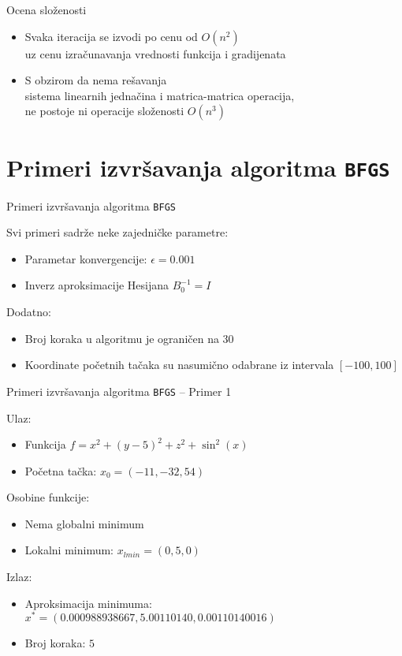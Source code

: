 \documentclass[serbian]{beamer}
\begin{document}
\begin{frame}{Ocena slo\v zenosti}

\begin{itemize}
	\item Svaka iteracija se izvodi po cenu od $O(n^2)$ \\
	uz cenu izra\v cunavanja vrednosti funkcija i gradijenata
	
	\item S obzirom da nema re\v savanja \\
	sistema linearnih jedna\v cina i matrica-matrica operacija, \\
	ne postoje ni operacije slo\v zenosti $O(n^3)$
\end{itemize}

\end{frame}

\section{Primeri izvr\v savanja algoritma \texttt{BFGS}}

\begin{frame}{Primeri izvr\v savanja algoritma \texttt{BFGS}}

Svi primeri sadr\v ze neke zajedni\v cke parametre:
\begin{itemize}
	\item Parametar konvergencije: $\epsilon = 0.001$
	\item Inverz aproksimacije Hesijana $B_0^{-1} = I$
\end{itemize}

Dodatno:
\begin{itemize}
	\item Broj koraka u algoritmu je ograni\v cen na $30$
	\item Koordinate po\v cetnih ta\v caka su nasumi\v cno odabrane iz intervala $[-100, 100]$
\end{itemize}

\end{frame}

\begin{frame}{Primeri izvr\v savanja algoritma \texttt{BFGS} -- Primer 1}

Ulaz:
\begin{itemize}
	\item Funkcija $f = x^2 + (y-5)^2 + z^2 + \sin^2(x)$
	\item Po\v cetna ta\v cka: $x_0 = (-11, -32, 54)$
\end{itemize}

Osobine funkcije:
\begin{itemize}
	\item Nema globalni minimum
	\item Lokalni minimum: $x_{lmin} = (0, 5, 0)$
\end{itemize}

Izlaz:
\begin{itemize}
	\item Aproksimacija minimuma: $x^* = (0.000988938667, 5.00110140, 0.00110140016)$
	\item Broj koraka: $5$
\end{itemize}

\end{frame}
\end{document}
